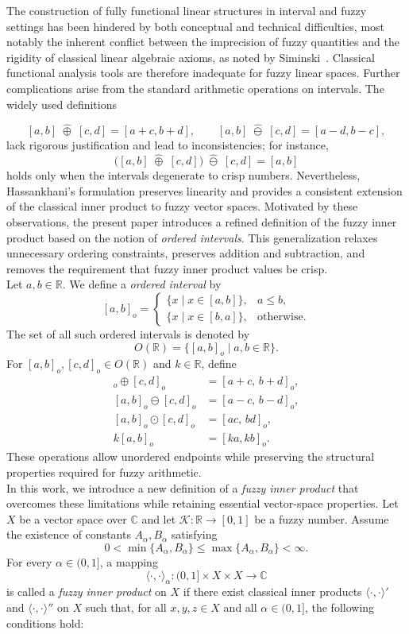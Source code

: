 \documentclass[preprint,12pt]{elsarticle}
\theoremstyle{definition}
\begin{document}
The construction of fully functional linear structures in interval and fuzzy settings 
has been hindered by both conceptual and technical difficulties, most notably the 
inherent conflict between the imprecision of fuzzy quantities and the rigidity of 
classical linear algebraic axioms, as noted by 
Siminski~\cite{Siminski2025Fuzzy}.
 Classical functional analysis tools are therefore inadequate for fuzzy linear spaces.
Further complications arise from the standard arithmetic operations on intervals. The widely used definitions

	
	\[
	[a,b]\;\widehat{\oplus}\;[c,d]=[a+c,b+d],
	\qquad
	[a,b]\;\widehat{\ominus}\;[c,d]=[a-d,b-c],
	\]
	lack rigorous justification and lead to inconsistencies; for instance,
	\[
	\bigl([a,b]\;\widehat{\oplus}\;[c,d]\bigr)\;\widehat{\ominus}\;[c,d]
	=[a,b]
	\]
	holds only when the intervals degenerate to crisp numbers. Nevertheless, Hassankhani’s formulation preserves linearity and provides a consistent extension of the classical inner product to fuzzy vector spaces.
	Motivated by these observations, the present paper introduces a refined definition of the fuzzy inner product based on the notion of \emph{ordered intervals}. This generalization relaxes unnecessary ordering constraints, preserves addition and subtraction, and removes the requirement that fuzzy inner product values be crisp. \\ 
	Let $a,b\in\mathbb{R}$. We define a \emph{ordered interval} by
	\[
	[a,b]_o=
	\begin{cases}
		\{x\mid x\in[a,b]\}, & a\le b,\\[2mm]
		\{x\mid x\in[b,a]\}, & \text{otherwise}.
	\end{cases}
	\]
	The set of all such ordered intervals is denoted by
	\[
	O(\mathbb{R})=\{[a,b]_o\mid a,b\in\mathbb{R}\}.
	\]
	For $[a,b]_o,[c,d]_o\in O(\mathbb{R})$ and $k\in\mathbb{R}$, define
	\begin{align*}
		[ a,b]_o\oplus[c,d]_o &= [a+c,\,b+d]_o,\\
		[ a,b]_o\ominus[c,d]_o &= [a-c,\,b-d]_o,\\
		[ a,b]_o\odot[c,d]_o &= [ac,\,bd]_o,\\
		k[a,b]_o &= [ka,kb]_o.
	\end{align*}
	These operations allow unordered endpoints while preserving the structural properties required for fuzzy arithmetic.\\
	In this work, we introduce a new definition of a \emph{fuzzy inner product} that overcomes these limitations while retaining essential vector-space properties. Let $X$ be a vector space over $\mathbb{C}$
	 and let $\mathcal{K}:\mathbb{R}\to[0,1]$ be a fuzzy number. Assume the existence of constants $A_\alpha,B_\alpha$ satisfying
	\[
	0<\min\{A_\alpha,B_\alpha\}\le \max\{A_\alpha,B_\alpha\}<\infty.
	\]
For every $\alpha \in (0,1]$, a mapping
\[
\langle \cdot, \cdot \rangle_\alpha : (0,1] \times X \times X \to \mathbb{C}
\]
is called a \emph{fuzzy inner product} on $X$ if there exist classical inner products $\langle \cdot, \cdot \rangle'$ and $\langle \cdot, \cdot \rangle''$ on $X$ such that, for all $x, y, z \in X$  and all $\alpha \in (0,1]$, the following conditions hold:
\end{document}

